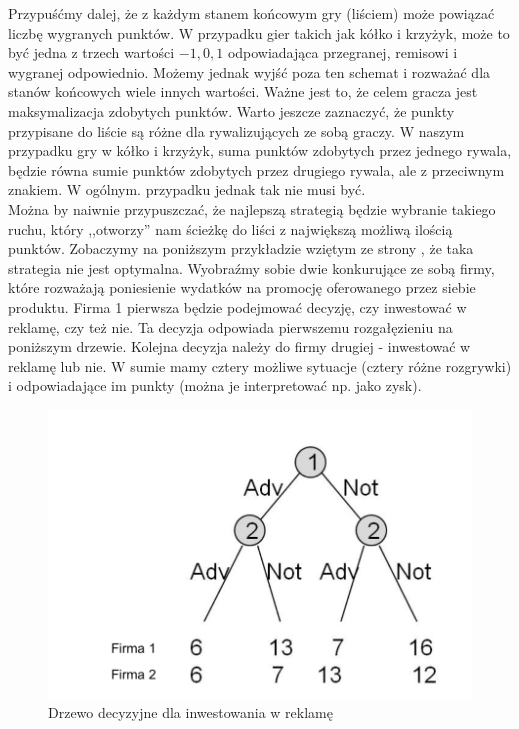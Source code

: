 \documentclass[licencjacka]{pracamgr}
\begin{document}
Przypuśćmy dalej, że z każdym stanem końcowym gry (liściem) może powiązać liczbę wygranych punktów. W przypadku gier takich jak kółko i krzyżyk, może to być jedna z trzech wartości ${-1, 0, 1}$  odpowiadająca przegranej, remisowi i wygranej odpowiednio.  Możemy jednak wyjść poza ten schemat i rozważać dla stanów końcowych wiele innych wartości.  Ważne jest to, że celem gracza jest maksymalizacja zdobytych punktów. Warto jeszcze zaznaczyć, że punkty przypisane do liście są różne dla rywalizujących ze sobą graczy. W naszym przypadku gry w kółko i krzyżyk, suma punktów zdobytych przez jednego rywala, będzie równa sumie punktów zdobytych przez drugiego rywala, ale z przeciwnym znakiem.  W ogólnym. przypadku jednak tak nie musi być. \\

 Można by naiwnie przypuszczać, że najlepszą strategią będzie wybranie takiego ruchu, który ,,otworzy'' nam ścieżkę do liści z największą możliwą ilością punktów. Zobaczymy na poniższym przykładzie wziętym ze strony \cite{Game}, że taka strategia nie jest optymalna. Wyobraźmy sobie dwie konkurujące ze sobą firmy, które rozważają poniesienie wydatków na promocję oferowanego przez siebie produktu. Firma 1 pierwsza będzie podejmować decyzję, czy inwestować w reklamę, czy też nie.  Ta decyzja odpowiada pierwszemu rozgałęzieniu na poniższym drzewie. Kolejna decyzja  należy do firmy drugiej - inwestować w reklamę lub nie. W sumie mamy cztery możliwe sytuacje (cztery różne rozgrywki) i odpowiadające im punkty (można je interpretować np. jako zysk). \\

\begin{center}
	\begin{figure}[h!]
	\includegraphics [scale=0.30] {advertise.png}
	\caption{Drzewo decyzyjne dla inwestowania w reklamę}
	\label{Rys2}
	\end{figure}
\end{center}
 
\end{document}
